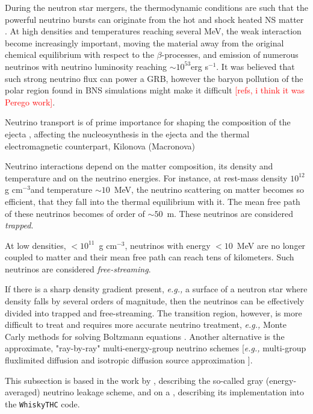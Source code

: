 \documentclass[11pt,a4paper,headinclude=true,DIV=14,BCOR=8mm,chapterprefix,listof=totoc,twoside,openright,abstracton]{scrbook}
\newcommand{\red}[1]{\textcolor{red}{#1}}
\newcommand{\gcm}{g cm$^{-3}$}
\begin{document}
During the neutron star mergers, the thermodynamic conditions are such that the powerful 
neutrino bursts can originate from the hot and shock heated NS matter \cite{Sekiguchi:2011zd}.
At high densities and temperatures reaching several MeV, the weak interaction become increasingly important, moving the material away from the original chemical equilibrium with respect to the 
$\beta$-processes, and emission of numerous neutrinos with neutrino luminosity reaching $\sim10^{53}$erg s$^{-1}$. 
It was believed that such strong neutrino flux can power a GRB, however the baryon pollution of the polar region found in BNS simulations might make it difficult \red{[refs, i think it was Perego work]}.

Neutrino transport is of prime importance for shaping the composition of the ejecta
\cite{Wanajo:2014,Sekiguchi:2015dma,Foucart:2015vpa,Foucart:2015gaa},
affecting the nucleosynthesis in the ejecta \cite{Wanajo:2014,Goriely:2015fqa} and the thermal
electromagnetic counterpart, Kilonova (Macronova) \cite{Metzger:2014ila,Lippuner:2015gwa}

Neutrino interactions depend on the matter composition, its density and temperature and on the neutrino energies. For instance, at rest-mass density $10^{12}$\gcm and temperature $\sim10$~MeV, the neutrino scattering on matter becomes so efficient, that they fall into the thermal equilibrium with it. 
The mean free path of these neutrinos becomes of order of $\sim 50$~m. 
These neutrinos are considered \textit{trapped}.

At low densities, $<10^{11}$~\gcm, neutrinos with energy $<10$~MeV are no longer coupled to matter and their mean free path can reach tens of kilometers. Such neutrinos are considered \textit{free-streaming}.

If there is a sharp density gradient present, \textit{e.g.,} a surface of a neutron star where density falls by several orders of magnitude, then the neutrinos can be effectively divided into trapped and free-streaming. 
The transition region, however, is more difficult to treat and requires more accurate neutrino treatment, \textit{e.g.,} Monte Carly methods for solving Boltzmann equations \cite{Abdikamalov:2012zi}. Another alternative is the approximate, "ray-by-ray" \cite{Scheck:2007gw} multi-energy-group neutrino schemes [\textit{e.g.,} multi-group fluxlimited diffusion \cite{Mezzacappa:1993gn} and isotropic diffusion source approximation \cite{Liebendoerfer:2007dz}].

This subsection is based in the work by \cite{Galeazzi:2013mia}, describing the so-called 
gray (energy-averaged) neutrino leakage scheme, and on a \cite{Radice:2016dwd,Radice:2018pdn}, describing its implementation into the \texttt{WhiskyTHC} code. 
\end{document}
